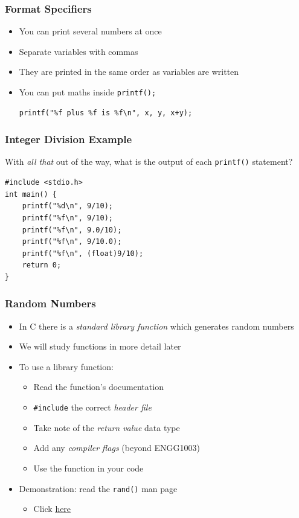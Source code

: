 \documentclass[14pt]{beamer}
\begin{document}
\begin{frame}[fragile]
\frametitle{Format Specifiers}
\begin{itemize}
\item You can print several numbers at once
\item Separate variables with commas
\item They are printed in the same order as variables are written
\item You can put maths inside \texttt{printf();}
\begin{lstlisting}[style=CStyle]
printf("%f plus %f is %f\n", x, y, x+y);
\end{lstlisting}
\end{itemize}
\end{frame}

\begin{frame}[fragile]
\frametitle{Integer Division Example}
With \textit{all that} out of the way, what is the output of each \texttt{printf()} statement?
\begin{lstlisting}[style=CStyle,caption=\texttt{intdiv.c}]
#include <stdio.h>
int main() {
	printf("%d\n", 9/10);
	printf("%f\n", 9/10);
	printf("%f\n", 9.0/10);
	printf("%f\n", 9/10.0);
	printf("%f\n", (float)9/10);
	return 0;
}
\end{lstlisting}
\end{frame}

\begin{frame}[fragile]
\frametitle{Random Numbers}
\begin{itemize}
\item In C there is a \textit{standard library function} which generates random numbers
\item We will study functions in more detail later
\item To use a library function:
	\begin{itemize}
		\item Read the function's documentation
		\item \texttt{\#include} the correct \textit{header file}
		\item Take note of the \textit{return value} data type
		\item Add any \textit{compiler flags} (beyond ENGG1003)
		\item Use the function in your code
	\end{itemize}
\item Demonstration: read the \texttt{rand()} man page
	\begin{itemize}
		\item Click \underline{\href{http://man7.org/linux/man-pages/man3/rand.3.html}{here}}
	\end{itemize}
\end{itemize}
\end{frame}
\end{document}
